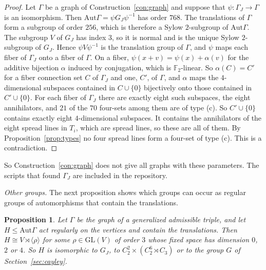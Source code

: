 \documentclass[11pt]{amsart}
\newtheorem{proposition}[theorem]{Proposition}
\theoremstyle{definition}
\newcommand{\F}{\mathbb{F}}
\newcommand{\GL}{\mathrm{GL}}
\newcommand{\Aut}{\mathrm{Aut}}
\begin{document}
\begin{proof}
Let $\Gamma$ be a graph of Construction~\ref{con:graph} and suppose that $\psi\colon\Gamma_J\to\Gamma$ is an isomorphism. Then $\Aut\Gamma=\psi G_J\psi^{-1}$ has order $768$. The translations of $\Gamma$ form a subgroup of order $256$, which is therefore a Sylow $2$-subgroup of $\Aut\Gamma$. The subgroup $V$ of $G_J$ has index $3$, so it is normal and is the unique Sylow $2$-subgroup of $G_J$. Hence $\psi V\psi^{-1}$ is the translation group of $\Gamma$, and $\psi$ maps each fiber of $\Gamma_J$ onto a fiber of $\Gamma$. On a fiber, $\psi(x+v)=\psi(x)+\alpha(v)$ for the additive bijection $\alpha$ induced by conjugation, which is $\F_2$-linear. So $\alpha(C)=C'$ for a fiber connection set $C$ of $\Gamma_J$ and one, $C'$, of $\Gamma$, and $\alpha$ maps the $4$-dimensional subspaces contained in $C\cup\{0\}$ bijectively onto those contained in $C'\cup\{0\}$. For each fiber of $\Gamma_J$ there are exactly eight such subspaces, the eight annihilators, and $21$ of the $70$ four-sets among them are of type (c). So $C'\cup\{0\}$ contains exactly eight $4$-dimensional subspaces. It contains the annihilators of the eight spread lines in $T_i$, which are spread lines, so these are all of them. By Proposition~\ref{prop:types} no four spread lines form a four-set of type (c). This is a contradiction.
\end{proof}

So Construction~\ref{con:graph} does not give all graphs with these parameters. The scripts that found $\Gamma_J$ are included in the repository.

\emph{Other groups.} The next proposition shows which groups can occur as regular groups of automorphisms that contain the translations.

\begin{proposition}\label{prop:groups}
Let $\Gamma$ be the graph of a generalized admissible triple, and let $H\le\Aut\Gamma$ act regularly on the vertices and contain the translations. Then $H\cong V\rtimes\langle\rho\rangle$ for some $\rho\in\GL(V)$ of order $3$ whose fixed space has dimension $0$, $2$ or $4$. So $H$ is isomorphic to $G_J$, to $C_2^2\times(C_2^6\rtimes C_3)$ or to the group $G$ of Section~\ref{sec:cayley}.
\end{proposition}
\end{document}
